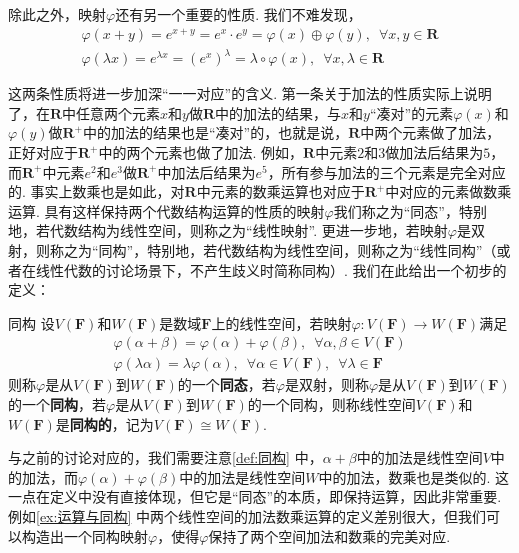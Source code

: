除此之外，映射$\varphi$还有另一个重要的性质. 我们不难发现，
\begin{gather*}
    \varphi(x+y)=e^{x+y}=e^x\cdot e^y=\varphi(x)\oplus\varphi(y),\enspace\forall x,y\in\mathbf{R} \\
    \varphi(\lambda x)=e^{\lambda x}=(e^x)^\lambda=\lambda\circ\varphi(x),\enspace\forall x,\lambda\in\mathbf{R}
\end{gather*}

这两条性质将进一步加深``一一对应''的含义. 第一条关于加法的性质实际上说明了，在$\mathbf{R}$中任意两个元素$x$和$y$做$\mathbf{R}$中的加法的结果，与$x$和$y$``凑对''的元素$\varphi(x)$和$\varphi(y)$做$\mathbf{R}^+$中的加法的结果也是``凑对''的，也就是说，$\mathbf{R}$中两个元素做了加法，正好对应于$\mathbf{R}^+$中的两个元素也做了加法. 例如，$\mathbf{R}$中元素$2$和$3$做加法后结果为$5$，而$\mathbf{R}^+$中元素$e^2$和$e^3$做$\mathbf{R}^+$中加法后结果为$e^5$，所有参与加法的三个元素是完全对应的. 事实上数乘也是如此，对$\mathbf{R}$中元素的数乘运算也对应于$\mathbf{R}^+$中对应的元素做数乘运算. 具有这样保持两个代数结构运算的性质的映射$\varphi$我们称之为``同态''，特别地，若代数结构为线性空间，则称之为``线性映射''. 更进一步地，若映射$\varphi$是双射，则称之为``同构''，特别地，若代数结构为线性空间，则称之为``线性同构''（或者在线性代数的讨论场景下，不产生歧义时简称同构）. 我们在此给出一个初步的定义：
\begin{definition}{}{同构}
    设$V(\mathbf{F})$和$W(\mathbf{F})$是数域$\mathbf{F}$上的线性空间，若映射$\varphi:V(\mathbf{F})\to W(\mathbf{F})$满足
    \begin{gather*}
        \varphi(\alpha+\beta)=\varphi(\alpha)+\varphi(\beta),\enspace\forall\alpha,\beta\in V(\mathbf{F}) \\
        \varphi(\lambda\alpha)=\lambda\varphi(\alpha),\enspace\forall\alpha\in V(\mathbf{F}),\enspace\forall\lambda\in\mathbf{F}
    \end{gather*}
    则称$\varphi$是从$V(\mathbf{F})$到$W(\mathbf{F})$的一个\textbf{同态}，若$\varphi$是双射，则称$\varphi$是从$V(\mathbf{F})$到$W(\mathbf{F})$的一个\textbf{同构}，若$\varphi$是从$V(\mathbf{F})$到$W(\mathbf{F})$的一个同构，则称线性空间$V(\mathbf{F})$和$W(\mathbf{F})$是\textbf{同构的}，记为$V(\mathbf{F})\cong W(\mathbf{F})$.
\end{definition}

与之前的讨论对应的，我们需要注意\autoref{def:同构} 中，$\alpha+\beta$中的加法是线性空间$V$中的加法，而$\varphi(\alpha)+\varphi(\beta)$中的加法是线性空间$W$中的加法，数乘也是类似的. 这一点在定义中没有直接体现，但它是``同态''的本质，即保持运算，因此非常重要. 例如\autoref{ex:运算与同构} 中两个线性空间的加法数乘运算的定义差别很大，但我们可以构造出一个同构映射$\varphi$，使得$\varphi$保持了两个空间加法和数乘的完美对应.

